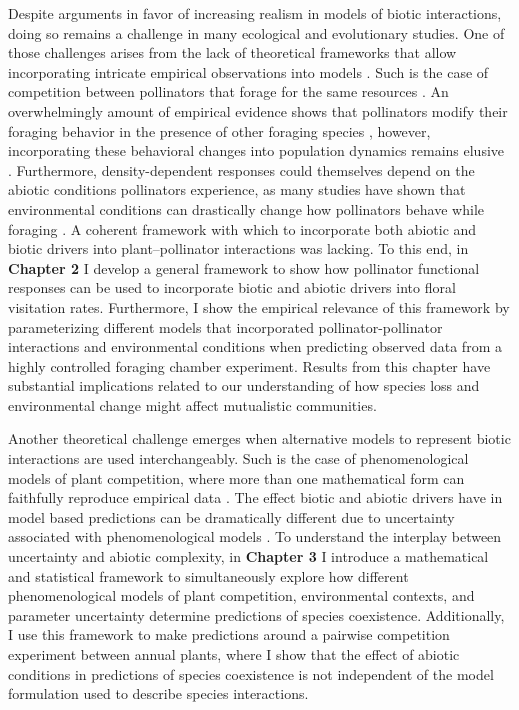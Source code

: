 \documentclass[12pt]{article}
\begin{document}
Despite arguments in favor of increasing realism in models of biotic interactions, doing so remains a challenge in many ecological and evolutionary studies. One of those challenges arises from the lack of theoretical frameworks that allow incorporating intricate empirical observations into models \citep{abrams1983arguments}.  Such is the case of competition between pollinators that forage for the same resources \citep{thomson_importance_2020}. An overwhelmingly amount of empirical evidence shows that pollinators modify their foraging behavior in the presence of other foraging species \citep{morse_resource_1977,inouye_resource_1978,thompson_dynamics_2006,brosi_single_2013,briggs_competitive_2016}, however, incorporating these behavioral changes into population dynamics remains elusive \citep{thomson_importance_2020}. Furthermore, density-dependent responses could themselves depend on the abiotic conditions pollinators experience, as many studies have shown that environmental conditions can drastically change how pollinators behave while foraging \citep{heinrich_resource_1976,thomson_response_1987,cnaani_flower_2006,westphal_bumblebees_2006,briggs2018variation,classen2020specialization}. A coherent framework with which to incorporate both abiotic and biotic drivers into plant--pollinator interactions was lacking. To this end, in \textbf{Chapter 2} I develop a general framework to show how pollinator functional responses can be used to incorporate biotic and abiotic drivers into floral visitation rates. Furthermore, I show the empirical relevance of this framework by parameterizing different models that incorporated pollinator-pollinator interactions and environmental conditions when predicting observed data from a highly controlled foraging chamber experiment. Results from this chapter have substantial implications related to our understanding of how species loss and environmental change might affect mutualistic communities.


Another theoretical challenge emerges when alternative models to represent biotic interactions are used interchangeably. Such is the case of phenomenological models of plant competition, where more than one mathematical form can faithfully reproduce empirical data \citep{levine2009importance,godoy_phenology_2014,godoy_phylogenetic_2014,mayfield2017higher,bimler_accurate_2018}. The effect biotic and abiotic drivers have in model based predictions can be dramatically different due to uncertainty associated with phenomenological models \citep{jorgensen2001fundamentals,flora_structural_2011, aldebert_clement_community_2018}. To understand the interplay between uncertainty and abiotic complexity, in \textbf{Chapter 3} I introduce a mathematical and statistical framework to simultaneously explore how different phenomenological models of plant competition, environmental contexts, and parameter uncertainty determine predictions of species coexistence. Additionally, I use this framework to make predictions around a pairwise competition experiment between annual plants, where I show that the effect of abiotic conditions in predictions of species coexistence is not independent of the model formulation used to describe species interactions.
\end{document}
